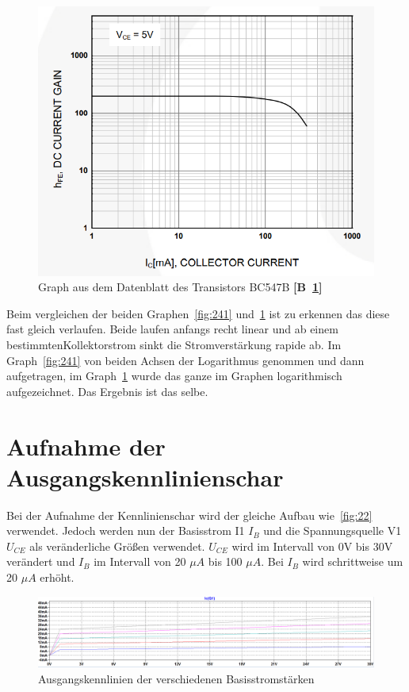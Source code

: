         \begin{figure}[!ht]
            \centering
            \includegraphics[]{Bilder/24datenblatt.PNG}
            \caption{Graph aus dem Datenblatt des Transistors BC547B \textbf{[B~\ref{fig:242}]}}
            \label{fig:242}
        \end{figure}

        Beim vergleichen der beiden Graphen~\ref{fig:241} und~\ref{fig:242} ist zu erkennen das diese fast gleich verlaufen. Beide laufen anfangs recht linear und ab einem bestimmtenKollektorstrom sinkt die Stromverstärkung rapide ab. Im Graph~\ref{fig:241} von beiden Achsen der Logarithmus genommen und dann aufgetragen, im Graph~\ref{fig:242} wurde das ganze im Graphen logarithmisch aufgezeichnet. Das Ergebnis ist das selbe.
        \newpage

    \section{Aufnahme der Ausgangskennlinienschar}
        Bei der Aufnahme der Kennlinienschar wird der gleiche Aufbau wie~\ref{fig:22} verwendet. Jedoch werden nun der Basisstrom I1 \(I_B\) und die Spannungsquelle V1 \(U_{CE}\) als veränderliche Größen verwendet. \(U_{CE}\) wird im Intervall von 0V bis 30V verändert und \(I_B\) im Intervall von 20 \(\mu A\) bis 100 \(\mu A\). Bei \(I_B\) wird schrittweise um 20 \(\mu A\) erhöht.

        \begin{figure}[!ht]
            \centering
            \includegraphics[width=\linewidth]{Bilder/25graph1.PNG}
            \caption{Ausgangskennlinien der verschiedenen Basisstromstärken}
            \label{fig:251}
        \end{figure}

